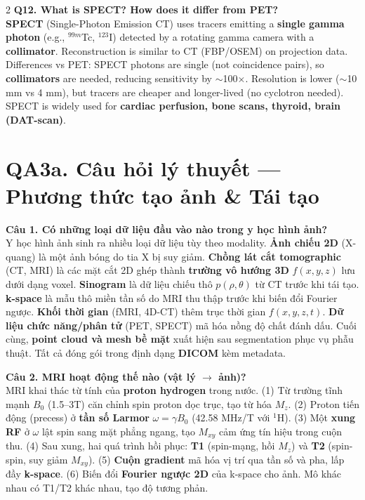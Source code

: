 \begin{paracol}{2}
\textbf{Q12. What is SPECT? How does it differ from PET?}\\
\textbf{SPECT} (Single-Photon Emission CT) uses tracers emitting a \textbf{single gamma photon} (e.g., $^{99m}$Tc, $^{123}$I) detected by a rotating gamma camera with a \textbf{collimator}. Reconstruction is similar to CT (FBP/OSEM) on projection data. Differences vs PET: SPECT photons are single (not coincidence pairs), so \textbf{collimators} are needed, reducing sensitivity by $\sim$100$\times$. Resolution is lower ($\sim$10 mm vs 4 mm), but tracers are cheaper and longer-lived (no cyclotron needed). SPECT is widely used for \textbf{cardiac perfusion, bone scans, thyroid, brain (DAT-scan)}.

\switchcolumn

\section*{QA3a. Câu hỏi lý thuyết --- Phương thức tạo ảnh \& Tái tạo}

\textbf{Câu 1. Có những loại dữ liệu đầu vào nào trong y học hình ảnh?}\\
Y học hình ảnh sinh ra nhiều loại dữ liệu tùy theo modality. \textbf{Ảnh chiếu 2D} (X-quang) là một ảnh bóng do tia X bị suy giảm. \textbf{Chồng lát cắt tomographic} (CT, MRI) là các mặt cắt 2D ghép thành \textbf{trường vô hướng 3D} $f(x,y,z)$ lưu dưới dạng voxel. \textbf{Sinogram} là dữ liệu chiếu thô $p(\rho,\theta)$ từ CT trước khi tái tạo. \textbf{k-space} là mẫu thô miền tần số do MRI thu thập trước khi biến đổi Fourier ngược. \textbf{Khối thời gian} (fMRI, 4D-CT) thêm trục thời gian $f(x,y,z,t)$. \textbf{Dữ liệu chức năng/phân tử} (PET, SPECT) mã hóa nồng độ chất đánh dấu. Cuối cùng, \textbf{point cloud và mesh bề mặt} xuất hiện sau segmentation phục vụ phẫu thuật. Tất cả đóng gói trong định dạng \textbf{DICOM} kèm metadata.

\textbf{Câu 2. MRI hoạt động thế nào (vật lý $\to$ ảnh)?}\\
MRI khai thác từ tính của \textbf{proton hydrogen} trong nước. (1) Từ trường tĩnh mạnh $B_0$ (1.5--3T) căn chỉnh spin proton dọc trục, tạo từ hóa $M_z$. (2) Proton tiến động (precess) ở \textbf{tần số Larmor} $\omega = \gamma B_0$ (42.58 MHz/T với $^1$H). (3) Một \textbf{xung RF} ở $\omega$ lật spin sang mặt phẳng ngang, tạo $M_{xy}$ cảm ứng tín hiệu trong cuộn thu. (4) Sau xung, hai quá trình hồi phục: \textbf{T1} (spin-mạng, hồi $M_z$) và \textbf{T2} (spin-spin, suy giảm $M_{xy}$). (5) \textbf{Cuộn gradient} mã hóa vị trí qua tần số và pha, lấp đầy \textbf{k-space}. (6) Biến đổi \textbf{Fourier ngược 2D} của k-space cho ảnh. Mô khác nhau có T1/T2 khác nhau, tạo độ tương phản.


\end{paracol}
